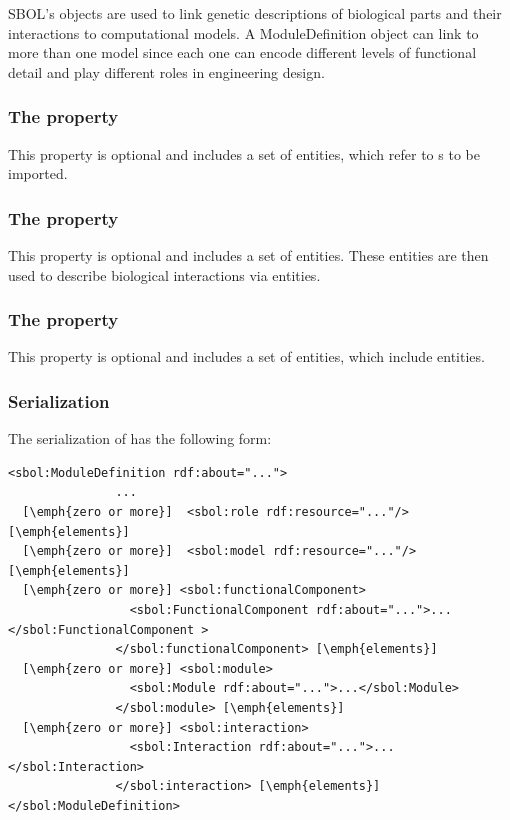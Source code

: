 SBOL's  objects are used to link genetic descriptions of biological parts and their interactions to computational models.
A ModuleDefinition object can link to more than one model since each one can encode different levels of functional detail and play different roles in engineering design. 


\subsubsection*{The  property}\label{sec:modules}
This property is optional and includes a set of  entities, which refer to s to be imported.

\subsubsection*{The  property}
\label{sec:functionalComponents}
This property is optional and includes a set of  entities. These entities are then used to describe biological interactions via  entities.


\subsubsection*{The  property}\label{sec:interactions}
This property is optional and includes a set of  entities, which include  entities.

\subsubsection*{Serialization}

The serialization of  has the following form:
\begin{lstlisting}
<sbol:ModuleDefinition rdf:about="...">
               ...
  [\emph{zero or more}]  <sbol:role rdf:resource="..."/> [\emph{elements}]
  [\emph{zero or more}]  <sbol:model rdf:resource="..."/> [\emph{elements}]
  [\emph{zero or more}] <sbol:functionalComponent>
                 <sbol:FunctionalComponent rdf:about="...">...</sbol:FunctionalComponent >
               </sbol:functionalComponent> [\emph{elements}]
  [\emph{zero or more}] <sbol:module>
                 <sbol:Module rdf:about="...">...</sbol:Module>
               </sbol:module> [\emph{elements}]
  [\emph{zero or more}] <sbol:interaction>
                 <sbol:Interaction rdf:about="...">...</sbol:Interaction>
               </sbol:interaction> [\emph{elements}]
</sbol:ModuleDefinition>
\end{lstlisting}

